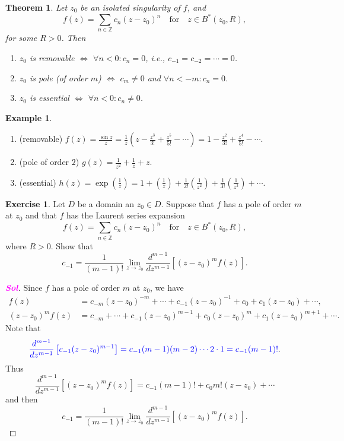 \documentclass[12pt,openany]{book}
\newtheorem{theorem}{Theorem}[chapter]
\theoremstyle{definition}
\newtheorem{exercise}{Exercise}[section]
\newtheorem{example}{Example}[section]
\newcommand{\Z}{\mathbb{Z}}
\newcommand{\of}[1]{\left( #1 \right)}
\newcommand{\sol}{\textcolor{magenta}{\bf Sol}}
\newcommand{\ie}{\textnormal{i.e.}}
\begin{document}
	\newpage
	\begin{tcolorbox}[colback=white,colframe=thmcolor,arc=5pt,title={\color{white}\bf Classification of Singularities via Laurent Coefficients}]
		\begin{theorem}
			Let $z_0$ be an isolated singularity of $f$, and \[
			f(z)=\sum_{n\in\Z}c_n(z-z_0)^n\quad\text{for}\quad z\in B^*(z_0,R),
			\] for some $R>0$. Then \begin{enumerate}[(1)]
			\item $z_0$ is removable $\iff$ $\forall n<0:c_n=0$, \ie, $c_{-1}=c_{-2}=\cdots=0$.
			\item $z_0$ is pole (of order $m$) $\iff$ $c_m\neq 0$ and $\forall n<-m:c_n=0$.
			\item $z_0$ is essential $\iff$ $\forall n<0:c_n\neq 0$.
		\end{enumerate}
		\end{theorem}
	\end{tcolorbox}
	\vspace{4pt}
	\begin{example}
		\ \begin{enumerate}
			\item (removable) $\displaystyle f(z)=\frac{\sin z}{z}=\frac{1}{z}\of{z-\frac{z^3}{3!}+\frac{z^5}{5!}-\cdots}=1-\frac{z^2}{3!}+\frac{z^4}{5!}-\cdots$.
			\item (pole of order $2$) $\displaystyle g(z)=\frac{1}{z^2}+\frac{1}{z}+z$.
			\item (essential) $\displaystyle h(z)=\exp\of{\frac{1}{z}}=1+\of{\frac{1}{z}}+\frac{1}{2!}\of{\frac{1}{z^2}}+\frac{1}{3!}\of{\frac{1}{z^3}}+\cdots$.
		\end{enumerate}
	\end{example}
	\vspace{8pt}
	\begin{exercise}
		Let $D$ be a domain an $z_0\in D$. Suppose that $f$ has a pole of order $m$ at $z_0$ and that $f$ has the Laurent series expansion \[
		f(z)=\sum_{n\in\Z} c_n(z-z_0)^n\quad\text{for}\quad z\in B^*(z_0,R),
		\] where $R>0$. Show that \[
		c_{-1}=\frac{1}{(m-1)!}\lim\limits_{z\to z_0}\frac{d^{m-1}}{dz^{m-1}}\left[(z-z_0)^mf(z)\right].
		\]
		\begin{proof}[\sol]
			Since $f$ has a pole of order $m$ at $z_0$, we have \begin{align*}
				f(z)&=c_{-m}(z-z_0)^{-m}+\cdots +c_{-1}(z-z_0)^{-1}+c_0+c_1(z-z_0)+\cdots,\\
				(z-z_0)^mf(z)&=c_{-m}+\cdots +c_{-1}(z-z_0)^{m-1}+c_0(z-z_0)^m+c_1(z-z_0)^{m+1}+\cdots.
			\end{align*} Note that \[
			\textcolor{blue}{\frac{d^{m-1}}{dz^{m-1}}\left[c_{-1}(z-z_0)^{m-1}\right]=c_{-1}(m-1)(m-2)\cdots2\cdot1=c_{-1}(m-1)!}.
			\] Thus \[
			\frac{d^{m-1}}{dz^{m-1}}\left[(z-z_0)^mf(z)\right]=c_{-1}(m-1)!+c_0m!(z-z_0)+\cdots
			\] and then \[
			c_{-1}=\frac{1}{(m-1)!}\lim\limits_{z\to z_0}\frac{d^{m-1}}{dz^{m-1}}\left[(z-z_0)^mf(z)\right].
			\]
		\end{proof}
	\end{exercise}
\end{document}

